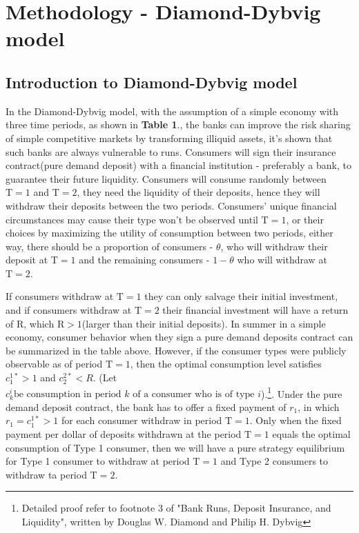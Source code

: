 \documentclass[a4paper]{article}
\begin{document}
\section{Methodology - Diamond-Dybvig model} \label{Methodology}
\vspace{-0.25cm}
\subsection{Introduction to Diamond-Dybvig model}\label{Diamond-Dybvig model}
\vspace{-0.25cm}

\quad \quad In the Diamond-Dybvig model, with the assumption of a simple economy with three time periods, as shown in \textbf{Table 1}., the banks can improve the risk sharing of simple competitive markets by transforming illiquid assets, it's shown that such banks are always vulnerable to runs. 
 Consumers will sign their insurance contract(pure demand deposit) with a financial institution - preferably a bank, to guarantee their future liquidity. Consumers will consume randomly between $\textrm{T} = 1$ and $\textrm{T} = 2$, they need the liquidity of their deposits, hence they will withdraw their deposits between the two periods. Consumers' unique financial circumstances may cause their type won't be observed until $\textrm{T} = 1$, or their choices by maximizing the utility of consumption between two periods, either way, there should be a proportion of consumers - $\theta$, who will withdraw their deposit at $\textrm{T} = 1$ and the remaining consumers - $1 - \theta$ who will withdraw at $\textrm{T} = 2$. 

If consumers withdraw at $\textrm{T} = 1$ they can only salvage their initial investment, and if consumers withdraw at $\textrm{T} = 2$ their financial investment will have a return of $\textrm{R}$, which $\textrm{R} > 1$(larger than their initial deposits). In summer in a simple economy, consumer behavior when they sign a pure demand deposits contract can be summarized in the table above. However, if the consumer types were publicly observable as of period $\textrm{T} = 1$, then the optimal consumption level satisfies $c^{1\ast}_{1} > 1$ and $c^{2\ast}_{2} < R$. (Let $c^{i}_{k} \textrm{be consumption in period } k \textrm{ of a consumer who is of type } i$).\footnote{Detailed proof refer to footnote 3 of "Bank Runs, Deposit Insurance, and Liquidity", written by Douglas W. Diamond and Philip H. Dybvig}. Under the pure demand deposit contract, the bank has to offer a fixed payment of $r_{1}$, in which $r_{1} = c^{1\ast}_{1} > 1$ for each consumer withdraw in period $\textrm{T} = 1$. Only when the fixed payment per dollar of deposits withdrawn at the period $\textrm{T} = 1$ equals the optimal consumption of Type 1 consumer, then we will have a pure strategy equilibrium for Type 1 consumer to withdraw at period $\textrm{T} = 1$ and Type 2 consumers to withdraw ta period $\textrm{T} = 2$.
\end{document}
